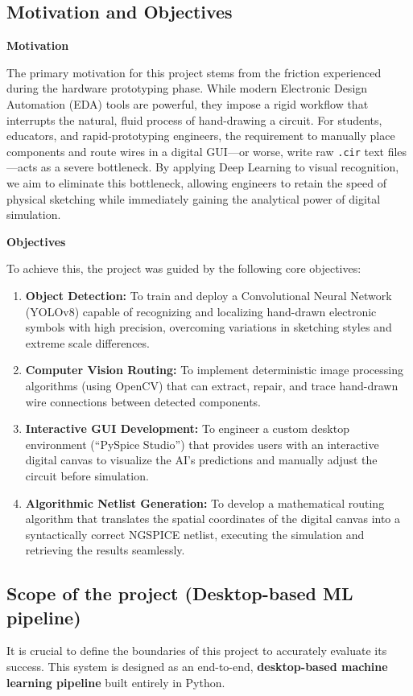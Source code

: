 \newpage

\subsection{Motivation and Objectives}
\noindent \textbf{Motivation}\par
The primary motivation for this project stems from the friction experienced during the hardware prototyping phase. While modern Electronic Design Automation (EDA) tools are powerful, they impose a rigid workflow that interrupts the natural, fluid process of hand-drawing a circuit. For students, educators, and rapid-prototyping engineers, the requirement to manually place components and route wires in a digital GUI—or worse, write raw \texttt{.cir} text files—acts as a severe bottleneck. By applying Deep Learning to visual recognition, we aim to eliminate this bottleneck, allowing engineers to retain the speed of physical sketching while immediately gaining the analytical power of digital simulation.

\vspace{0.5cm}
\noindent \textbf{Objectives}\par
To achieve this, the project was guided by the following core objectives:
\begin{enumerate}
    \item \textbf{Object Detection:} To train and deploy a Convolutional Neural Network (YOLOv8) capable of recognizing and localizing hand-drawn electronic symbols with high precision, overcoming variations in sketching styles and extreme scale differences.
    \item \textbf{Computer Vision Routing:} To implement deterministic image processing algorithms (using OpenCV) that can extract, repair, and trace hand-drawn wire connections between detected components.
    \item \textbf{Interactive GUI Development:} To engineer a custom desktop environment (``PySpice Studio'') that provides users with an interactive digital canvas to visualize the AI's predictions and manually adjust the circuit before simulation.
    \item \textbf{Algorithmic Netlist Generation:} To develop a mathematical routing algorithm that translates the spatial coordinates of the digital canvas into a syntactically correct NGSPICE netlist, executing the simulation and retrieving the results seamlessly.
\end{enumerate}

\newpage
\subsection{Scope of the project (Desktop-based ML pipeline)}
It is crucial to define the boundaries of this project to accurately evaluate its success. This system is designed as an end-to-end, \textbf{desktop-based machine learning pipeline} built entirely in Python.


